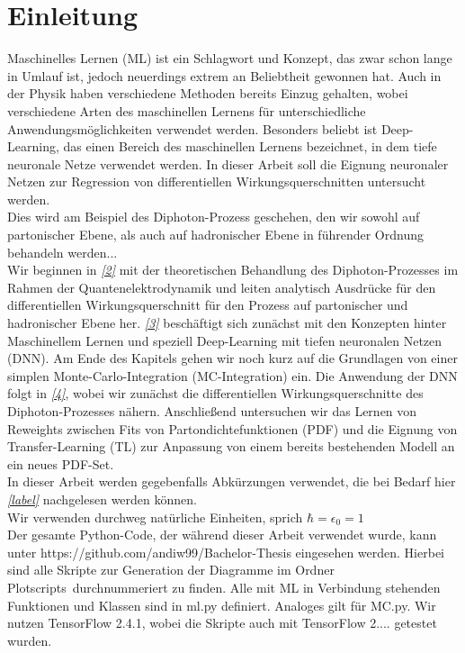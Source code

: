 \chapter{Einleitung}
Maschinelles Lernen (ML) ist ein Schlagwort und Konzept, das zwar schon lange in Umlauf ist, jedoch neuerdings extrem an Beliebtheit gewonnen hat. Auch in der Physik haben verschiedene Methoden bereits Einzug gehalten, wobei verschiedene Arten des maschinellen Lernens für unterschiedliche Anwendungsmöglichkeiten verwendet werden. Besonders beliebt ist Deep-Learning, das einen Bereich des maschinellen Lernens bezeichnet, in dem tiefe neuronale Netze verwendet werden. In dieser Arbeit soll die Eignung neuronaler Netzen zur Regression von differentiellen Wirkungsquerschnitten untersucht werden. \\
\newline
Dies wird am Beispiel des Diphoton-Prozess geschehen, den wir sowohl auf partonischer Ebene, als auch auf hadronischer Ebene in führender Ordnung behandeln werden... \\
\newline
Wir beginnen in \textit{\autoref{2}} mit der theoretischen Behandlung des Diphoton-Prozesses im Rahmen der Quantenelektrodynamik und leiten analytisch Ausdrücke für den differentiellen Wirkungsquerschnitt für den Prozess auf partonischer und hadronischer Ebene her. \textit{\autoref{3}} beschäftigt sich zunächst mit den Konzepten hinter Maschinellem Lernen und speziell Deep-Learning mit tiefen neuronalen Netzen (DNN). Am Ende des Kapitels gehen wir noch kurz auf die Grundlagen von einer simplen Monte-Carlo-Integration (MC-Integration) ein. Die Anwendung der DNN folgt in \textit{\autoref{4}}, wobei wir zunächst die differentiellen Wirkungsquerschnitte des Diphoton-Prozesses nähern. Anschließend untersuchen wir das Lernen von Reweights zwischen Fits von Partondichtefunktionen (PDF) und die Eignung von Transfer-Learning (TL) zur Anpassung von einem bereits bestehenden Modell an ein neues PDF-Set. \\
\newline
In dieser Arbeit werden gegebenfalls Abkürzungen verwendet, die bei Bedarf hier \textit{\autoref{label}} nachgelesen werden können. \\
Wir verwenden durchweg natürliche Einheiten, sprich $\hbar = \epsilon_0 = 1$ \\
\newline
Der gesamte Python-Code, der während dieser Arbeit verwendet wurde, kann unter https://github.com/andiw99/Bachelor-Thesis eingesehen werden. Hierbei sind alle Skripte zur Generation der Diagramme im Ordner \glqq Plotscripts\grqq~durchnummeriert zu finden. Alle mit ML in Verbindung stehenden Funktionen und Klassen sind in ml.py definiert. Analoges gilt für MC.py. Wir nutzen TensorFlow 2.4.1, wobei die Skripte auch mit TensorFlow 2.... getestet wurden.

